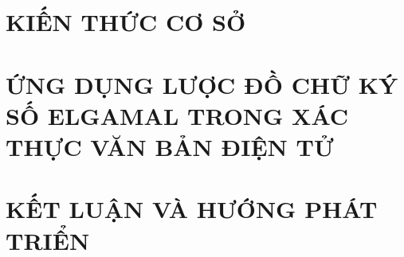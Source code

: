 \documentclass[a4paper, oneside]{report}
\renewcommand{\headrulewidth}{0pt} %
\theoremstyle{plain}
\theoremstyle{definition}
\theoremstyle{remark}
\begin{document}
	
	
	
	\newpage
	
	\pagestyle{fancy}
	\fancyhf{}
	\fancyhead[RE, LO]{\leftmark}
	\fancyfoot[RE, LO]{\thepage}
	\renewcommand{\headrulewidth}{0.4pt}

	\chapter{KIẾN THỨC CƠ SỞ}
	\label{chapter:KienThucCoSo}
	

	\newpage
	\chapter{ỨNG DỤNG LƯỢC ĐỒ CHỮ KÝ SỐ ELGAMAL TRONG XÁC THỰC VĂN BẢN ĐIỆN TỬ}
	\label{chapter:UngDungElGamal}
	

	\newpage
	\chapter{KẾT LUẬN VÀ HƯỚNG PHÁT TRIỂN}
	\label{chapter:KetLuan}
	
	

	
	\printbibliography[heading=bibintoc]
\end{document}
